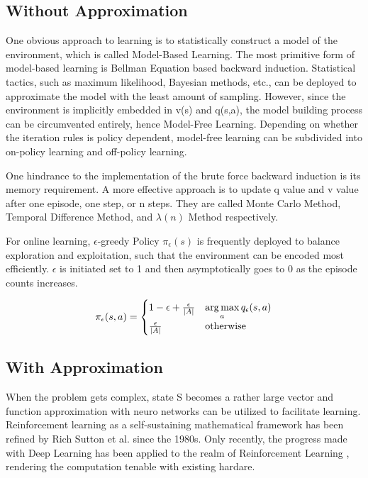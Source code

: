 \subsection{Without Approximation}
One obvious approach to learning is to statistically construct a model of the environment, which is called Model-Based Learning. The most primitive form of model-based learning is Bellman Equation based backward induction. Statistical tactics, such as maximum likelihood, Bayesian methods, etc., can be deployed to approximate the model with the least amount of sampling. However, since the environment is implicitly embedded in v(s) and q(s,a), the model building process can be circumvented entirely, hence Model-Free Learning. Depending on whether the iteration rules is policy dependent, model-free learning can be subdivided into on-policy learning and off-policy learning.

One hindrance to the implementation of the brute force backward induction is its memory requirement. A more effective approach is to update q value and v value after one episode, one step, or n steps. They are called Monte Carlo Method, Temporal Difference Method, and $\lambda(n)$ Method respectively.

For online learning, $\epsilon$-greedy Policy $\pi_{\epsilon}(s)$ is frequently deployed to balance exploration and exploitation, such that the environment can be encoded most efficiently. $\epsilon$ is initiated set to 1 and then asymptotically goes to 0 as the episode counts increases.

\begin{equation*}
    \pi_{\epsilon}(s,a) = \begin{cases}
        1-\epsilon+\frac{\epsilon}{|A|}& \displaystyle\operatorname*{arg\,max}_{a} q_{\epsilon}(s,a)\\
        \frac{\epsilon}{|A|}& \text{otherwise}\\
           \end{cases}
\end{equation*}

\subsection{With Approximation}
When the problem gets complex, state S becomes a rather large vector and function approximation with neuro networks can be utilized to facilitate learning. Reinforcement learning as a self-sustaining mathematical framework has been refined by Rich Sutton et al. since the 1980s. Only recently, the progress made with Deep Learning has been applied to the realm of Reinforcement Learning \cite{Mnih2013PlayingAW}, rendering the computation tenable with existing hardare.

